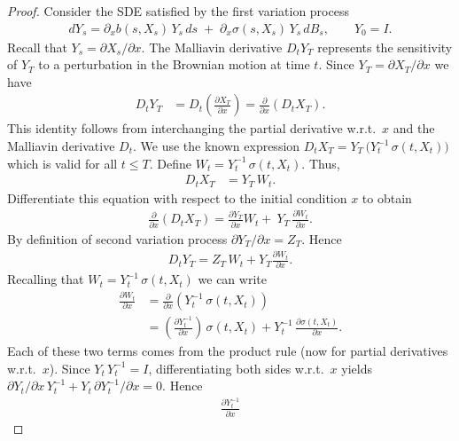 \documentclass[]{interact}
\newcommand{\1}{\mathbf{1}}
\theoremstyle{plain}%
\theoremstyle{definition}
\theoremstyle{remark}
\numberwithin{equation}{section}
\begin{document}
\begin{proof}
\noindent
Consider the SDE satisfied by the first variation process 
\begin{align*}
dY_s 
= \partial_x b(s, X_s)\, Y_s \, ds 
   \;+\;
   \partial_x \sigma(s, X_s)\, Y_s \, dB_s, \qquad 
Y_0 = I.
\end{align*}
Recall that \(Y_s =\partial X_s/\partial x\). 
%
The Malliavin derivative \( D_t Y_T \) represents the sensitivity of \( Y_T \) 
to a perturbation in the Brownian motion at time \( t \). Since 
\( Y_T = \partial X_T/\partial x \) we have
\begin{align*}
D_t Y_T 
&= D_t \left(\frac{\partial X_T}{\partial x}\right) 
= \frac{\partial}{\partial x} \left(D_t X_T\right).
\end{align*}
This identity follows from interchanging the partial derivative w.r.t.\ \(x\) and the Malliavin derivative \(D_t\). We use the known expression 
\(\displaystyle D_t X_T = Y_T\,\bigl(Y_t^{-1}\,\sigma(t, X_t)\bigr)\) 
which is valid for all \( t \leq T\).  Define \(\displaystyle W_t = Y_t^{-1}\,\sigma(t, X_t)\).  
Thus,
\begin{align*}
D_t X_T 
&= Y_T \,W_t.
\end{align*}
Differentiate this equation with respect to the initial condition \(x\) to obtain
\begin{align*}
\frac{\partial}{\partial x} (D_t X_T)
=\frac{\partial Y_T}{\partial x}W_t +\
   Y_T \,\frac{\partial W_t}{\partial x}.
\end{align*}
By definition of second variation process \(\partial Y_T/\partial x = Z_T\). Hence
\begin{align}
D_t Y_T= Z_T\,W_t + Y_T \frac{\partial W_t}{\partial x}.
\label{a1}
\end{align}
Recalling that \( W_t = Y_t^{-1}\,\sigma(t, X_t)\) we can write
\begin{align*}
\frac{\partial W_t}{\partial x}
&= \frac{\partial}{\partial x} 
   \left(Y_t^{-1} \,\sigma(t, X_t)\right) \\
&= \left(\frac{\partial Y_t^{-1}}{\partial x}\right)\,\sigma(t, X_t)+
   Y_t^{-1}\,\frac{\partial \sigma(t, X_t)}{\partial x}.
\end{align*}
Each of these two terms comes from the product rule (now for partial derivatives w.r.t.\ \(x\)).
%
Since \(Y_t\,Y_t^{-1} = I\), differentiating both sides w.r.t.\ \(x\) yields 
\(\partial Y_t/\partial x\,Y_t^{-1} + Y_t\,\partial Y_t^{-1}/\partial x = 0.\)  
Hence
\begin{align*}
\frac{\partial Y_t^{-1}}{\partial x}

\end{align*}
\end{proof}
\end{document}
